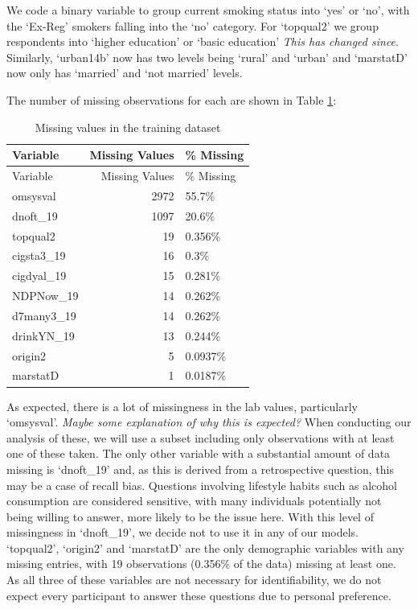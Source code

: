 \documentclass[
  11pt,
]{article}
\begin{document}
We code a binary variable to group current smoking status into `yes' or
`no', with the `Ex-Reg' smokers falling into the `no' category. For
`topqual2' we group respondents into `higher education' or `basic
education' \emph{This has changed since}. Similarly, `urban14b' now has
two levels being `rural' and `urban' and `marstatD' now only has
`married' and `not married' levels.

The number of missing observations for each are shown in Table
\ref{tab:output-na-table}:

\begin{longtable}[]{@{}lrl@{}}
\caption{Missing values in the training
dataset\label{tab:output-na-table}}\tabularnewline
\toprule\noalign{}
Variable & Missing Values & \% Missing \\
\midrule\noalign{}
\endfirsthead
\toprule\noalign{}
Variable & Missing Values & \% Missing \\
\midrule\noalign{}
\endhead
\bottomrule\noalign{}
\endlastfoot
omsysval & 2972 & 55.7\% \\
dnoft\_19 & 1097 & 20.6\% \\
topqual2 & 19 & 0.356\% \\
cigsta3\_19 & 16 & 0.3\% \\
cigdyal\_19 & 15 & 0.281\% \\
NDPNow\_19 & 14 & 0.262\% \\
d7many3\_19 & 14 & 0.262\% \\
drinkYN\_19 & 13 & 0.244\% \\
origin2 & 5 & 0.0937\% \\
marstatD & 1 & 0.0187\% \\
\end{longtable}

As expected, there is a lot of missingness in the lab values,
particularly `omsysval'. \emph{Maybe some explanation of why this is
expected?} When conducting our analysis of these, we will use a subset
including only observations with at least one of these taken. The only
other variable with a substantial amount of data missing is `dnoft\_19'
and, as this is derived from a retrospective question, this may be a
case of recall bias. Questions involving lifestyle habits such as
alcohol consumption are considered sensitive, with many individuals
potentially not being willing to answer, more likely to be the issue
here. With this level of missingness in `dnoft\_19', we decide not to
use it in any of our models. `topqual2', `origin2' and `marstatD' are
the only demographic variables with any missing entries, with 19
observations (0.356\% of the data) missing at least one. As all three of
these variables are not necessary for identifiability, we do not expect
every participant to answer these questions due to personal preference.
\end{document}
